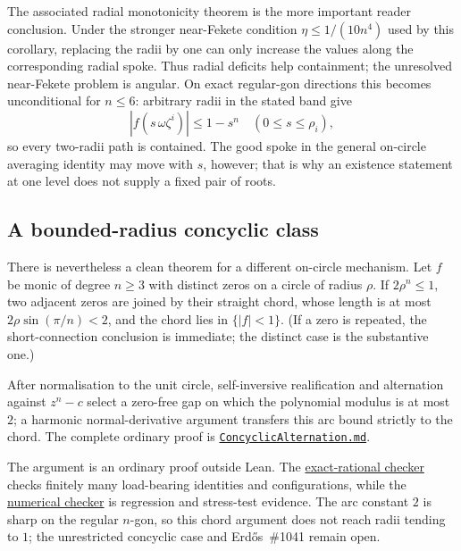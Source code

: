The associated radial monotonicity theorem is the more important reader
conclusion.  Under the stronger near-Fekete condition
$\eta\le1/(10n^4)$ used by this corollary, replacing the radii by one can only
increase the values along the corresponding radial spoke.  Thus
radial deficits help containment; the unresolved near-Fekete problem is
angular.  On exact regular-gon directions this becomes unconditional for
$n\le6$: arbitrary radii in the stated band give
\[
 |f(s\,\omega\zeta^i)|\le1-s^n
 \quad(0\le s\le\rho_i),
\]
so every two-radii path is contained.  The good spoke in the general
on-circle averaging identity may move with $s$, however; that is why an
existence statement at one level does not supply a fixed pair of roots.

\subsection*{A bounded-radius concyclic class}

There is nevertheless a clean theorem for a different on-circle mechanism.
Let $f$ be monic of degree $n\ge3$ with distinct zeros on a circle of radius
$\rho$.  If $2\rho^n\le1$, two adjacent zeros are joined by their straight
chord, whose length is at most $2\rho\sin(\pi/n)<2$, and the chord lies in
$\{|f|<1\}$.  (If a zero is repeated, the short-connection conclusion is
immediate; the distinct case is the substantive one.)

After normalisation to
the unit circle, self-inversive realification and alternation against $z^n-c$
select a zero-free gap on which the polynomial modulus is at most $2$; a
harmonic normal-derivative argument transfers this arc bound strictly to the
chord.  The complete ordinary proof is
\href{https://github.com/wcook04/plectis-erdos/blob/f214a6b45528dc5eefe20ffadc35f2e981627d4c/research_corpus/Erdos1041/ConcyclicAlternation.md}{\texttt{ConcyclicAlternation.md}}.

The argument is an ordinary proof outside Lean.  The
\href{https://github.com/wcook04/plectis-erdos/blob/f214a6b45528dc5eefe20ffadc35f2e981627d4c/research_corpus/Erdos1041/scripts/check_erdos1041_concyclic_exact_witness.py}{exact-rational checker}
checks finitely many load-bearing identities and configurations, while the
\href{https://github.com/wcook04/plectis-erdos/blob/f214a6b45528dc5eefe20ffadc35f2e981627d4c/research_corpus/Erdos1041/scripts/check_erdos1041_concyclic_alternation.py}{numerical checker}
is regression and stress-test evidence.  The arc constant $2$ is sharp on the
regular $n$-gon, so this chord argument does not reach radii tending to $1$;
the unrestricted concyclic case and Erd\H{o}s~\#1041 remain open.

